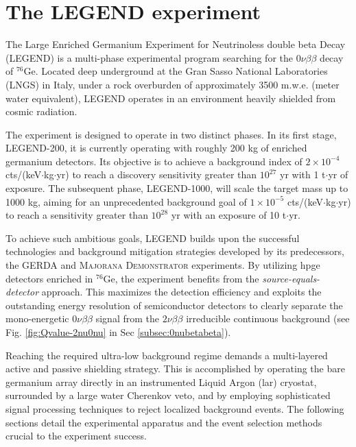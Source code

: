 \chapter{The LEGEND experiment}
\label{ch:legend}

The Large Enriched Germanium Experiment for Neutrinoless double beta Decay (LEGEND) is a multi-phase experimental program searching for the $0\nu\beta\beta$ decay of ${}^{76}$Ge. Located deep underground at the Gran Sasso National Laboratories (LNGS) in Italy, under a rock overburden of approximately 3500 m.w.e. (meter water equivalent), LEGEND operates in an environment heavily shielded from cosmic radiation.

The experiment is designed to operate in two distinct phases. In its first stage, LEGEND-200, it is currently operating with roughly 200 kg of enriched germanium detectors. Its objective is to achieve a background index of $2 \times 10^{-4}$ cts/(keV$\cdot$kg$\cdot$yr) to reach a discovery sensitivity greater than $10^{27}$ yr with 1 t$\cdot$yr of exposure. The subsequent phase, LEGEND-1000, will scale the target mass up to 1000 kg, aiming for an unprecedented background goal of $1 \times 10^{-5}$ cts/(keV$\cdot$kg$\cdot$yr) to reach a sensitivity greater than $10^{28}$ yr with an exposure of 10 t$\cdot$yr.

To achieve such ambitious goals, LEGEND builds upon the successful technologies and background mitigation strategies developed by its predecessors, the GERDA and \textsc{Majorana Demonstrator} experiments. By utilizing \ac{hpge} detectors enriched in ${}^{76}$Ge, the experiment benefits from the \textit{source-equals-detector} approach. This maximizes the detection efficiency and exploits the outstanding energy resolution of semiconductor detectors to clearly separate the mono-energetic $0\nu\beta\beta$ signal from the $2\nu\beta\beta$ irreducible continuous background (see Fig. \ref{fig:Qvalue-2nu0nu} in Sec \ref{subsec:0nubetabeta}).

Reaching the required ultra-low background regime demands a multi-layered active and passive shielding strategy. This is accomplished by operating the bare germanium array directly in an instrumented Liquid Argon (\ac{lar}) cryostat, surrounded by a \ac{lar}ge water Cherenkov veto, and by employing sophisticated signal processing techniques to reject localized background events. The following sections detail the experimental apparatus and the event selection methods crucial to the experiment success. \cite{LEGEND:GeDet}

